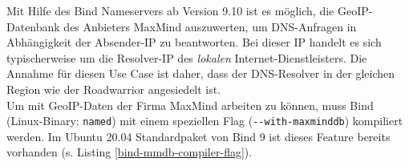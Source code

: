 Mit Hilfe des Bind Nameservers ab Version 9.10 ist es möglich, die \gls{GeoIP}-Datenbank des Anbieters MaxMind auszuwerten, um \gls{DNS}-Anfragen in Abhängigkeit der Absender-IP zu beantworten\cite{bindgeoip2020}. Bei dieser IP handelt es sich typischerweise um die Resolver-IP des \textit{lokalen} Internet-Dienstleisters. Die Annahme für diesen Use Case ist daher, dass der \gls{DNS}-Resolver in der gleichen Region wie der \gls{Roadwarrior} angesiedelt ist\label{dns-resolver-region}.\\
Um mit \gls{GeoIP}-Daten der Firma MaxMind arbeiten zu können, muss Bind (Linux-Binary: \texttt{named}) mit einem speziellen Flag (\texttt{-{}-with-maxminddb}) kompiliert werden. Im Ubuntu 20.04 Standardpaket von Bind 9 ist dieses Feature bereits vorhanden (s. Listing \ref{bind-mmdb-compiler-flag}).

